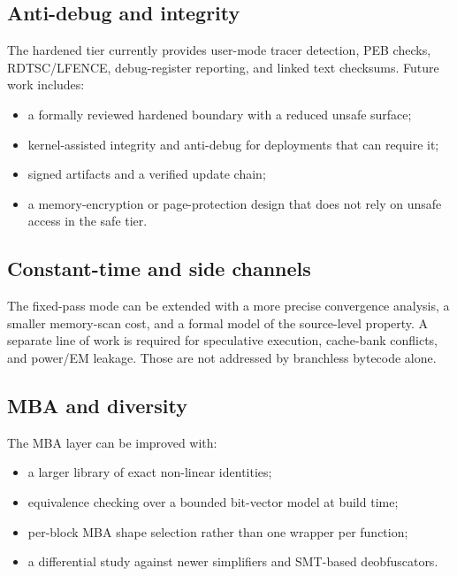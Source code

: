 \subsection{Anti-debug and integrity}

The hardened tier currently provides user-mode tracer detection, PEB checks,
RDTSC/LFENCE, debug-register reporting, and linked text checksums. Future work
includes:

\begin{itemize}
  \item a formally reviewed hardened boundary with a reduced unsafe surface;
  \item kernel-assisted integrity and anti-debug for deployments that can
        require it;
  \item signed artifacts and a verified update chain;
  \item a memory-encryption or page-protection design that does not rely on
        unsafe access in the safe tier.
\end{itemize}

\subsection{Constant-time and side channels}

The fixed-pass mode can be extended with a more precise convergence analysis, a
smaller memory-scan cost, and a formal model of the source-level property. A
separate line of work is required for speculative execution, cache-bank
conflicts, and power/EM leakage. Those are not addressed by branchless bytecode
alone.

\subsection{MBA and diversity}

The MBA layer can be improved with:

\begin{itemize}
  \item a larger library of exact non-linear identities;
  \item equivalence checking over a bounded bit-vector model at build time;
  \item per-block MBA shape selection rather than one wrapper per function;
  \item a differential study against newer simplifiers and SMT-based
        deobfuscators.
\end{itemize}

